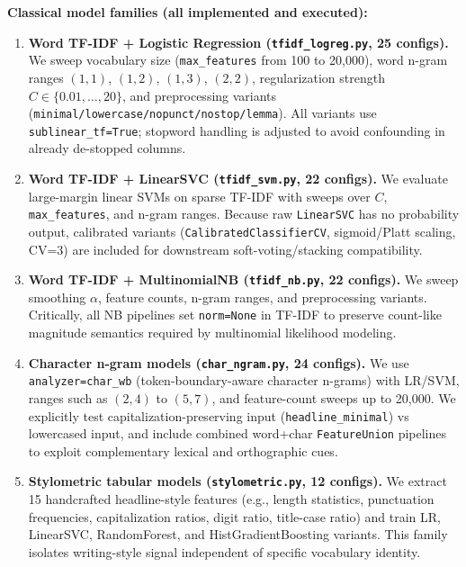 \documentclass[10pt]{article}
\begin{document}
\textbf{Classical model families (all implemented and executed):}
\begin{enumerate}
    \item \textbf{Word TF-IDF + Logistic Regression (\texttt{tfidf\_logreg.py}, 25 configs).}
    We sweep vocabulary size (\texttt{max\_features} from 100 to 20,000), word n-gram ranges \((1,1)\), \((1,2)\), \((1,3)\), \((2,2)\), regularization strength \(C\in\{0.01,\dots,20\}\), and preprocessing variants (\texttt{minimal/lowercase/nopunct/nostop/lemma}). All variants use \texttt{sublinear\_tf=True}; stopword handling is adjusted to avoid confounding in already de-stopped columns.

    \item \textbf{Word TF-IDF + LinearSVC (\texttt{tfidf\_svm.py}, 22 configs).}
    We evaluate large-margin linear SVMs on sparse TF-IDF with sweeps over \(C\), \texttt{max\_features}, and n-gram ranges. Because raw \texttt{LinearSVC} has no probability output, calibrated variants (\texttt{CalibratedClassifierCV}, sigmoid/Platt scaling, CV=3) are included for downstream soft-voting/stacking compatibility.

    \item \textbf{Word TF-IDF + MultinomialNB (\texttt{tfidf\_nb.py}, 22 configs).}
    We sweep smoothing \(\alpha\), feature counts, n-gram ranges, and preprocessing variants. Critically, all NB pipelines set \texttt{norm=None} in TF-IDF to preserve count-like magnitude semantics required by multinomial likelihood modeling.

    \item \textbf{Character n-gram models (\texttt{char\_ngram.py}, 24 configs).}
    We use \texttt{analyzer=char\_wb} (token-boundary-aware character n-grams) with LR/SVM, ranges such as \((2,4)\) to \((5,7)\), and feature-count sweeps up to 20,000. We explicitly test capitalization-preserving input (\texttt{headline\_minimal}) vs lowercased input, and include combined word+char \texttt{FeatureUnion} pipelines to exploit complementary lexical and orthographic cues.

    \item \textbf{Stylometric tabular models (\texttt{stylometric.py}, 12 configs).}
    We extract 15 handcrafted headline-style features (e.g., length statistics, punctuation frequencies, capitalization ratios, digit ratio, title-case ratio) and train LR, LinearSVC, RandomForest, and HistGradientBoosting variants. This family isolates writing-style signal independent of specific vocabulary identity.


\end{enumerate}
\end{document}
